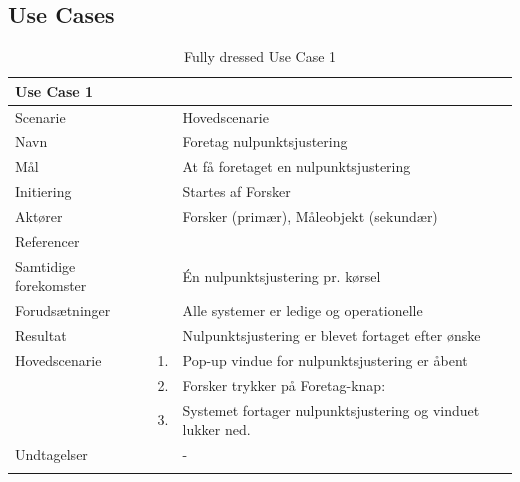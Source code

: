 \subsection{Use Cases}

\begin{longtabu} to  %
	{\large \textbf{Use Case 1}} && \\
	\toprule
	Scenarie 				&&	Hovedscenarie\\
	Navn 					&& 	Foretag nulpunktsjustering\\
	Mål 					&& 	At få foretaget en nulpunktsjustering\\
	Initiering 				&& 	Startes af Forsker\\
	Aktører 				&& 	Forsker (primær), Måleobjekt (sekundær)\\
	Referencer 				&& 	\\
	Samtidige forekomster  	&& 	Én nulpunktsjustering pr. kørsel \\
	Forudsætninger 			&&	Alle systemer er ledige og operationelle\\ 
	Resultat 				&& 	Nulpunktsjustering er blevet fortaget efter ønske\\ \midrule
	Hovedscenarie 			&    1. 	&	Pop-up vindue for nulpunktsjustering er åbent\\				 	
							&    2. 	& 	Forsker trykker på Foretag-knap:\\ 
							& 	 3.		&	 Systemet fortager nulpunktsjustering og vinduet lukker ned.\\[-1ex]
	Undtagelser 			&			& 	-  \\ \bottomrule
	
	\caption{Fully dressed Use Case 1}
	\label{UC1}
\end{longtabu}


